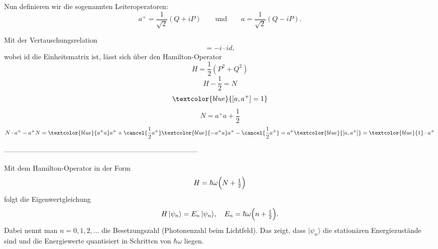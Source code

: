 Nun definieren wir die sogenannten Leiteroperatoren:
\[
a^{+} = \frac{1}{\sqrt{2}}(Q + iP)
\qquad\text{und}\qquad
a = \frac{1}{\sqrt{2}}(Q - iP).
\]

Mit der Vertauschungsrelation
\begin{equation}
	[P,Q] = -i \cdot id,
\end{equation}
wobei id die Einheitsmatrix ist, lässt sich über den Hamilton-Operator %
\begin{equation}
	H = \frac{1}{2}(P^2+Q^2)
\end{equation}
\begin{equation}
	H - \frac{1}{2} = N
\end{equation}
\begin{equation}
	\textcolor{blue}{[a, a^+] = 1}
\end{equation}
\begin{equation}
	N = a^+a + \frac{1}{2}
\end{equation}
\begin{equation}
	N\cdot a^+ - a^+N 
	= \textcolor{blue}{a^+a}a^+ + \cancel{\frac{1}{2}a^+} \textcolor{blue}{-a^+a}a^+ - \cancel{\frac{1}{2}a^+}
	= a^+\textcolor{blue}{[a, a^+]}
	= \textcolor{blue}{1}\cdot a^+
\end{equation}




-----------------------------------------------------------------------------------

Mit dem Hamilton-Operator in der Form
\begin{equation}
	H = \hbar\omega\Bigl(N + \tfrac12\Bigr)
\end{equation}
folgt die Eigenwertgleichung
\begin{equation}
	H\,|\psi_n\rangle = E_n\,|\psi_n\rangle,
  	\quad
	E_n = \hbar\omega\Bigl(n + \tfrac12\Bigr).
\end{equation}
Dabei nennt man $n = 0,1,2,\dots$ die Besetzungszahl (Photonenzahl beim Lichtfeld).
Das zeigt, dass $|\psi_n\rangle$ die stationären Energiezustände sind und die Energiewerte quantisiert in Schritten von $\hbar\omega$ liegen.


